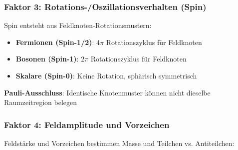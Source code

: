 	\begin{table}[htbp]
		\centering
		\caption{Räumliche Feldmuster für Teilchentypen}
		\label{tab:raeumliche_feldmuster}
	\end{table}
	
	\subsubsection{Faktor 3: Rotations-/Oszillationsverhalten (Spin)}
	\label{subsubsec:spin_verhalten}
	
	Spin entsteht aus Feldknoten-Rotationsmustern:
	
	\begin{tcolorbox}[colback=green!5!white,colframe=green!75!black,title=Spin aus Feldknoten-Rotation]
		\begin{itemize}
			\item \textbf{Fermionen (Spin-1/2)}: $4\pi$ Rotationszyklus für Feldknoten
			\item \textbf{Bosonen (Spin-1)}: $2\pi$ Rotationszyklus für Feldknoten
			\item \textbf{Skalare (Spin-0)}: Keine Rotation, sphärisch symmetrisch
		\end{itemize}
		
		\textbf{Pauli-Ausschluss}: Identische Knotenmuster können nicht dieselbe Raumzeitregion belegen
	\end{tcolorbox}
	
	\subsubsection{Faktor 4: Feldamplitude und Vorzeichen}
	\label{subsubsec:feldamplitude}
	
	Feldstärke und Vorzeichen bestimmen Masse und Teilchen vs. Antiteilchen:
	
